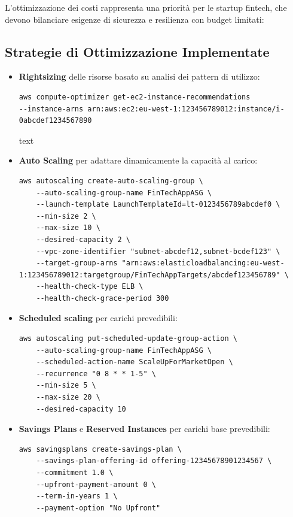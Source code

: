 \documentclass[a4paper,12pt]{report}
\begin{document}
L'ottimizzazione dei costi rappresenta una priorità per le startup fintech, che devono bilanciare esigenze di sicurezza e resilienza con budget limitati:

\subsection{Strategie di Ottimizzazione Implementate}

\begin{itemize}
\item \textbf{Rightsizing} delle risorse basato su analisi dei pattern di utilizzo:
\begin{verbatim}
aws compute-optimizer get-ec2-instance-recommendations
--instance-arns arn:aws:ec2:eu-west-1:123456789012:instance/i-0abcdef1234567890
\end{verbatim}

text
\item \textbf{Auto Scaling} per adattare dinamicamente la capacità al carico:
\begin{verbatim}
aws autoscaling create-auto-scaling-group \
    --auto-scaling-group-name FinTechAppASG \
    --launch-template LaunchTemplateId=lt-0123456789abcdef0 \
    --min-size 2 \
    --max-size 10 \
    --desired-capacity 2 \
    --vpc-zone-identifier "subnet-abcdef12,subnet-bcdef123" \
    --target-group-arns "arn:aws:elasticloadbalancing:eu-west-1:123456789012:targetgroup/FinTechAppTargets/abcdef123456789" \
    --health-check-type ELB \
    --health-check-grace-period 300
\end{verbatim}

\item \textbf{Scheduled scaling} per carichi prevedibili:
\begin{verbatim}
aws autoscaling put-scheduled-update-group-action \
    --auto-scaling-group-name FinTechAppASG \
    --scheduled-action-name ScaleUpForMarketOpen \
    --recurrence "0 8 * * 1-5" \
    --min-size 5 \
    --max-size 20 \
    --desired-capacity 10
\end{verbatim}

\item \textbf{Savings Plans} e \textbf{Reserved Instances} per carichi base prevedibili:
\begin{verbatim}
aws savingsplans create-savings-plan \
    --savings-plan-offering-id offering-12345678901234567 \
    --commitment 1.0 \
    --upfront-payment-amount 0 \
    --term-in-years 1 \
    --payment-option "No Upfront"
\end{verbatim}


\end{itemize}
\end{document}
